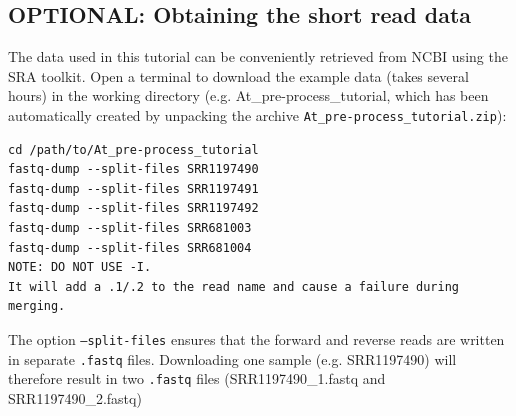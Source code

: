 \documentclass[a4paper,10pt]{article}
\begin{document}
\subsection{OPTIONAL: Obtaining the short read data}
The data used in this tutorial can be conveniently retrieved from NCBI using the SRA toolkit. Open a terminal to download the example data (takes several hours) in the working directory (e.g. At\_pre-process\_tutorial, which has been automatically created by unpacking the archive \texttt{At\_pre-process\_tutorial.zip}):
\begin{verbatim}
cd /path/to/At_pre-process_tutorial
fastq-dump --split-files SRR1197490
fastq-dump --split-files SRR1197491
fastq-dump --split-files SRR1197492
fastq-dump --split-files SRR681003
fastq-dump --split-files SRR681004
NOTE: DO NOT USE -I.
It will add a .1/.2 to the read name and cause a failure during merging. 
\end{verbatim}
The option \texttt{--split-files} ensures that the forward and reverse reads are written in separate \texttt{.fastq} files. Downloading one sample (e.g. SRR1197490) will therefore result in two \texttt{.fastq} files (SRR1197490\_1.fastq and SRR1197490\_2.fastq)
\clearpage
\end{document}
